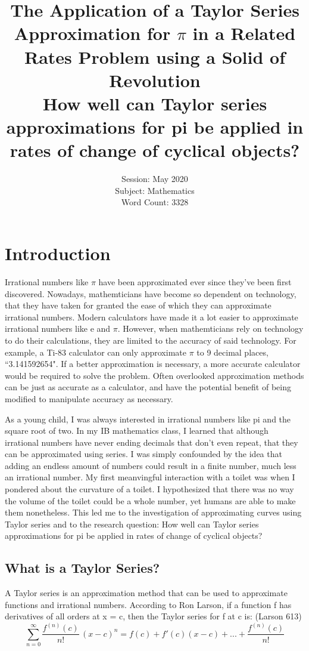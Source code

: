 \documentclass[12pt, titlepage]{article}
\date{Session: May 2020 \\ Subject: Mathematics \\ Word Count: 3328}
\title{The Application of a Taylor Series Approximation for \(\pi\) in a Related Rates Problem using a Solid of Revolution \bigskip \\  How well can Taylor series approximations for pi be applied in rates of change of cyclical objects?}
\begin{document}
\maketitle
\tableofcontents
\newpage

\section{Introduction}
Irrational numbers like \(\pi\) have been approximated ever since they've been first discovered. Nowadays, mathemticians have become so dependent on technology, that they have taken for granted the ease of which they can approximate irrational numbers. Modern calculators have made it a lot easier to approximate irrational numbers like e and \(\pi\). However, when mathemticians rely on technology to do their calculations, they are limited to the accuracy of said technology. For example, a Ti-83 calculator can only approximate \(\pi\) to 9 decimal places, ``3.141592654". If a better approximation is necessary, a more accurate calculator would be required to solve the problem. Often overlooked approximation methods can be just as accurate as a calculator, and have the potential benefit of being modified to manipulate accuracy as necessary.

As a young child, I was always interested in irrational numbers like pi and the square root of two. In my IB mathematics class, I learned that although irrational numbers have never ending decimals that don't even repeat, that they can be approximated using series. I was simply confounded by the idea that adding an endless amount of numbers could result in a finite number, much less an irrational number. My first meanvingful interaction with a toilet was when I pondered about the curvature of a toilet. I hypothesized that there was no way the volume of the toilet could be a whole number, yet humans are able to make them nonetheless. This led me to the investigation of approximating curves using Taylor series and to the research question: How well can Taylor series approximations for pi be applied in rates of change of cyclical objects?

\subsection{What is a Taylor Series?}
A Taylor series is an approximation method that can be used to approximate functions and irrational numbers. According to Ron Larson, if a function f has derivatives of all orders at x = c, then the Taylor series for f at c is: (Larson 613)
\begin{equation}
  \sum_{n=0}^{\infty} \frac{f^{(n)}(c)}{n!} \, (x-c)^{n} = f(c) + f'(c)(x-c) + ... +  \frac{f^{(n)}(c)}{n!}
\end{equation}
\end{document}
